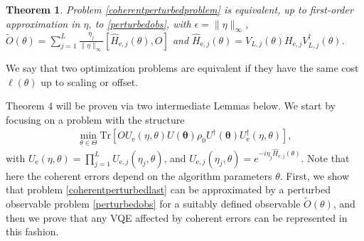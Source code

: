 \documentclass[letterpaper, 10 pt]{IEEEtran}  %
\newcommand{\Tr}{\mathrm{Tr}}
\newtheorem{theorem}{Theorem}
\begin{document}
\begin{theorem}
   Problem \eqref{coherentperturbedproblem} is equivalent, up to first-order approximation in $\eta$, to \eqref{perturbedobs}, with $\epsilon=\|\eta\|_\infty$, $\tilde{O}(\theta)=\sum_{j=1}^{L} \frac{\eta_j}{\|\eta\|_\infty} [\hat{H}_{\mathrm{e},j}(\theta), O]$ and $\hat{H}_{\mathrm{e},j}(\theta)=V_{L,j}(\theta)H_{\mathrm{e},j}V_{L,j}^\dagger(\theta)$.
\end{theorem}
We say that two optimization problems are equivalent if they have the same cost $\ell(\theta)$ up to scaling or offset.


Theorem 4 will be proven via two intermediate Lemmas below. 
We start by focusing on a problem with the structure 
\begin{align}
    \min_{\theta \in \Theta} \Tr[O U_\mathrm{e}(\eta, \theta){U}(\mathbf{\theta})\rho_0{U}^\dagger(\mathbf{\theta})U^\dagger_\mathrm{e}(\eta, \theta)], \label{coherentperturbedlast}
\end{align} 
with $U_\mathrm{e}(\eta, \theta)=\prod_{j=1}^{L}U_{\mathrm{e},j}(\eta_j, \theta)$, and $U_{\mathrm{e},j}(\eta_j, \theta)=e^{-i \eta_j \hat{H}_{\mathrm{e},j}(\theta)}$. 
Note that here the coherent errors depend on the algorithm parameters $\theta$.
First, we show that problem \eqref{coherentperturbedlast} can be approximated by a perturbed observable problem \eqref{perturbedobs} for a suitably defined observable $\tilde{O}(\theta)$, and then we prove that any VQE affected by coherent errors 
can be represented in this fashion. 
\end{document}
